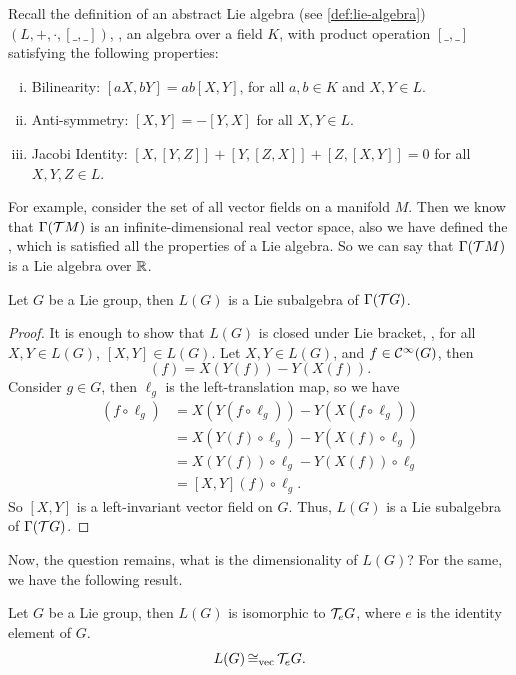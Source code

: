 Recall the definition of an abstract Lie algebra (see \cref{def:lie-algebra}) \((L, +, \cdot, [\_, \_])\), \ie, an algebra over a field \(K\), with product operation \([\_, \_]\) satisfying the following properties:
\begin{enumerate}[(i)]
    \item Bilinearity: \([a X, b Y] = a b [X, Y]\), for all \(a, b \in K\) and \(X, Y \in L\).
    \item Anti-symmetry: \([X, Y] = -[Y, X]\) for all \(X, Y \in L\).
    \item Jacobi Identity: \([X, [Y, Z]] + [Y, [Z, X]] + [Z, [X, Y]] = 0\) for all \(X, Y, Z \in L\).
\end{enumerate}
For example, consider the set of all vector fields on a manifold \(M\). Then we know that \(\Gamma(\mathcal T M)\) is an infinite-dimensional real vector space, also we have defined the , which is satisfied all the properties of a Lie algebra. So we can say that \(\Gamma(\mathcal T M)\) is a Lie algebra over \(\mathbb R\).
\begin{theorem}
    Let \(G\) be a Lie group, then \(L(G)\) is a Lie subalgebra of \(\Gamma(\mathcal T G)\).
\end{theorem}
\begin{proof}
    It is enough to show that \(L(G)\) is closed under Lie bracket, \ie, for all \(X, Y \in L(G)\), \([X, Y] \in L(G)\). Let \(X, Y \in L(G)\), and \(f \in \mathcal C^\infty(G)\), then
    \begin{equation*}
        [X, Y](f) = X(Y(f)) - Y(X(f)).
    \end{equation*}
    Consider \(g \in G\), then \(\ell_g\) is the left-translation map, so we have
    \begin{align*}
        [X, Y](f \circ \ell_g) & = X(Y(f \circ \ell_g)) - Y(X(f \circ \ell_g)) \\
                               & = X(Y(f) \circ \ell_g) - Y(X(f) \circ \ell_g) \\
                               & = X(Y(f)) \circ \ell_g - Y(X(f)) \circ \ell_g \\
                               & = [X, Y](f) \circ \ell_g.
    \end{align*}
    So \([X, Y]\) is a left-invariant vector field on \(G\). Thus, \(L(G)\) is a Lie subalgebra of \(\Gamma(\mathcal T G)\).
\end{proof}
Now, the question remains, what is the dimensionality of \(L(G)\)? For the same, we have the following result.
\begin{theorem}
    Let \(G\) be a Lie group, then \(L(G)\) is isomorphic to \(\mathcal T_e G\), where \(e\) is the identity element of \(G\).
    \begin{equation*}
        L(G) \operatorname{\mathrel{\cong_{\text{vec}}}} \mathcal T_e G.
    \end{equation*}
\end{theorem}
